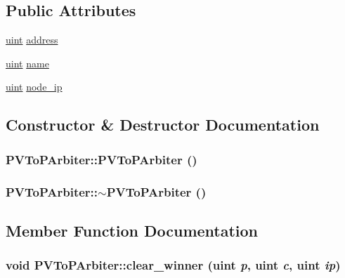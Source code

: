 \subsection*{Public Attributes}
\begin{CompactItemize}
\item 
\hyperlink{outputBuffer_8h_91ad9478d81a7aaf2593e8d9c3d06a14}{uint} \hyperlink{classPVToPArbiter_5e6a19c3667836f9ccacaeb90bfb11d6}{address}
\item 
\hyperlink{outputBuffer_8h_91ad9478d81a7aaf2593e8d9c3d06a14}{uint} \hyperlink{classPVToPArbiter_8ce6c3bf97bae927e6a2f9b2e5aaaf0b}{name}
\item 
\hyperlink{outputBuffer_8h_91ad9478d81a7aaf2593e8d9c3d06a14}{uint} \hyperlink{classPVToPArbiter_eda318acf7d024850c7d36a44250792b}{node\_\-ip}
\end{CompactItemize}


\subsection{Constructor \& Destructor Documentation}
\hypertarget{classPVToPArbiter_0cbecd7c187fb89df14024e437dff5ac}{
\subsubsection[{PVToPArbiter}]{\setlength{\rightskip}{0pt plus 5cm}PVToPArbiter::PVToPArbiter ()}}
\label{classPVToPArbiter_0cbecd7c187fb89df14024e437dff5ac}


\hypertarget{classPVToPArbiter_b76ac84d5073dbef1413d51d40d9e4de}{
\subsubsection[{$\sim$PVToPArbiter}]{\setlength{\rightskip}{0pt plus 5cm}PVToPArbiter::$\sim$PVToPArbiter ()}}
\label{classPVToPArbiter_b76ac84d5073dbef1413d51d40d9e4de}




\subsection{Member Function Documentation}
\hypertarget{classPVToPArbiter_1c82a296b196922859802d453c91a734}{
\subsubsection[{clear\_\-winner}]{\setlength{\rightskip}{0pt plus 5cm}void PVToPArbiter::clear\_\-winner ({\bf uint} {\em p}, \/  {\bf uint} {\em c}, \/  {\bf uint} {\em ip})}}
\label{classPVToPArbiter_1c82a296b196922859802d453c91a734}


